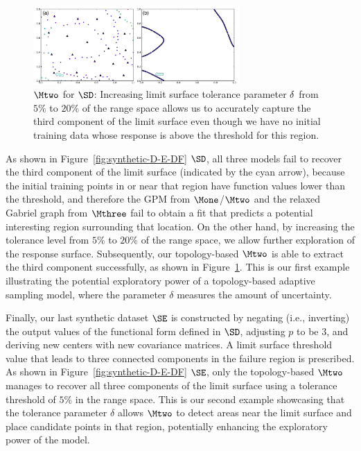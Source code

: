 \begin{figure}[b]
\centering
\includegraphics[width=0.7\textwidth]{figs/chap5/synthetic-D-20percent.pdf}
\caption{
$\protect\Mtwo$ for $\protect\SD$: Increasing limit surface tolerance parameter $\protect\delta$
from $5\%$ to $20\%$ of the range space allows us to accurately capture the third component of the limit surface even though we have no initial training data whose response is above the threshold for this region.
}
\label{fig:df-20percent}
\end{figure}

As shown in Figure~\ref{fig:synthetic-D-E-DF} $\SD$, all three models fail to recover the third component of the limit surface (indicated by the cyan arrow), because the initial training points in or near that region have function values lower than the threshold, and therefore the GPM from $\Mone$/$\Mtwo$ and the relaxed Gabriel graph from $\Mthree$ fail to obtain a fit that predicts a potential interesting region surrounding that location.
%
On the other hand, by increasing the tolerance level from $5\%$ to $20\%$ of the range space,  we allow further exploration of the response surface.
%
Subsequently, our topology-based $\Mtwo$ is able to extract the third component successfully, as shown in Figure~\ref{fig:df-20percent}.
%
This is our first example illustrating the potential exploratory power of a topology-based adaptive sampling model, where the parameter $\delta$ measures the amount of uncertainty.


Finally, our last synthetic dataset $\SE$ is constructed by negating (i.e., inverting) the output values of the functional form defined in $\SD$, adjusting $p$ to be $3$, and deriving new centers with new covariance matrices.
%
A limit surface threshold value that leads to three connected components in the failure region is prescribed.
%
As shown in Figure~\ref{fig:synthetic-D-E-DF} $\SE$, only the topology-based $\Mtwo$ manages to recover all three components of the limit surface using a tolerance threshold of $5\%$ in the range space.
%
This is our second example showcasing that the tolerance parameter $\delta$ allows $\Mtwo$ to detect areas near the limit surface and place candidate points in that region, potentially enhancing the exploratory power of the model.

